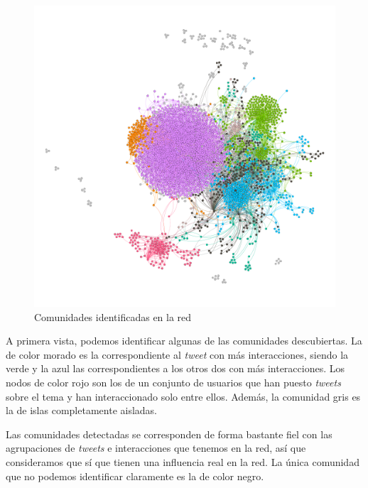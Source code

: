 \begin{figure}
    \centering
    \includegraphics[width=\textwidth]{images/graph/communities.png}
    \caption{Comunidades identificadas en la red}
    \label{fig:communities}
\end{figure}

A primera vista, podemos identificar algunas de las comunidades descubiertas. La
de color morado es la correspondiente al \textit{tweet} con más interacciones,
siendo la verde y la azul las correspondientes a los otros dos con más
interacciones. Los nodos de color rojo son los de un conjunto de usuarios que
han puesto \textit{tweets} sobre el tema y han interaccionado solo entre ellos.
Además, la comunidad gris es la de islas completamente aisladas.

Las comunidades detectadas se corresponden de forma bastante fiel con las
agrupaciones de \textit{tweets} e interacciones que tenemos en la red, así que
consideramos que sí que tienen una influencia real en la red. La única comunidad
que no podemos identificar claramente es la de color negro.
